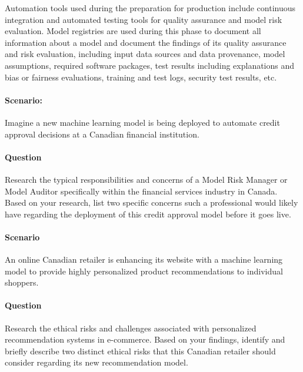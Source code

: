 Automation tools used during the preparation for production include continuous integration and automated testing tools for quality assurance and model risk evaluation. Model registries are used during this phase to document all information about a model and document the findings of its quality assurance and risk evaluation, including input data sources and data provenance, model assumptions, required software packages, test results including explanations and bias or fairness evaluations, training and test logs, security test results, etc. 

\begin{exercisebox}
\paragraph*{Scenario:}
Imagine a new machine learning model is being deployed to automate credit approval decisions at a Canadian financial institution.

\paragraph*{Question}
Research the typical responsibilities and concerns of a Model Risk Manager or Model Auditor specifically within the financial services industry in Canada. Based on your research, list two specific concerns such a professional would likely have regarding the deployment of this credit approval model before it goes live.
\end{exercisebox}

\begin{exercisebox}

\paragraph*{Scenario}
An online Canadian retailer is enhancing its website with a machine learning model to provide highly personalized product recommendations to individual shoppers.

\paragraph*{Question}
Research the ethical risks and challenges associated with personalized recommendation systems in e-commerce. Based on your findings, identify and briefly describe two distinct ethical risks that this Canadian retailer should consider regarding its new recommendation model.
\end{exercisebox}


